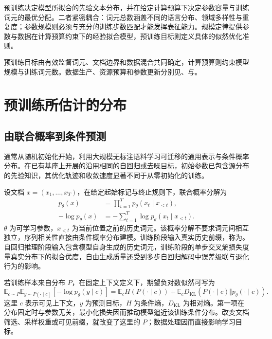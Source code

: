 \documentclass[../textbook.tex]{subfiles}
\begin{document}
\fi
{}

预训练决定模型所拟合的先验文本分布，并在给定计算预算下决定参数容量与训练词元的最优分配。二者紧密耦合：词元总数涵盖不同的语言分布、领域多样性与重复度；参数规模则必须与充分的训练步数匹配才能发挥表征能力。规模定律提供参数与数据在计算预算约束下的经验拟合模型，预训练目标则定义具体的似然优化准则。

预训练目标由有效监督词元、文档边界和数据混合共同确定，计算预算则约束模型规模与训练词元数。数据生产、资源预算和参数更新分别见、与。

\section{预训练所估计的分布}

\subsection{由联合概率到条件预测}
通常从随机初始化开始，利用大规模无标注语料学习可迁移的通用表示与条件概率分布。在已有基座上开展的沿用相同的自回归或去噪目标，初始参数已包含源分布的先验知识，其优化轨迹和收敛速度显著不同于从零初始化的训练。

设文档 $x=(x_1,\dots,x_T)$，在给定起始标记与终止规则下，联合概率分解为
\begin{equation}\label{eq:pt-chain}
\begin{aligned}
 p_\theta(x) &= \prod_{t=1}^{T}p_\theta(x_t\mid x_{<t}), \\
 -\log p_\theta(x) &= -\sum_{t=1}^{T}\log p_\theta(x_t\mid x_{<t}).
\end{aligned}
\end{equation}
$\theta$ 为可学习参数，$x_{<t}$ 为当前位置之前的历史词元。该概率分解不要求词元间相互独立，序列相关性直接由条件概率分布建模。训练阶段输入真实历史前缀，称为。自回归推理阶段输入包含模型自身生成的历史词元，训练阶段的单步交叉熵损失度量真实分布下的拟合优度，自由生成质量还受到多步自回归解码中误差级联与退化行为的影响。

若训练样本来自分布 $P$，在固定上下文定义下，期望负对数似然可写为
\begin{equation}
 \mathbb E_{c\sim P}\mathbb E_{y\sim P(\cdot\mid c)}[-\log p_\theta(y\mid c)]
 =\mathbb E_c H(P(\cdot\mid c))+
 \mathbb E_c D_{\mathrm{KL}}(P(\cdot\mid c)\Vert p_\theta(\cdot\mid c)).
 \label{eq:pt-risk}
\end{equation}
这里 $c$ 表示可见上下文，$y$ 为预测目标，$H$ 为条件熵，$D_{\mathrm{KL}}$ 为相对熵。第一项在分布固定时与参数无关，最小化损失因而推动模型逼近该训练条件分布。改变文档筛选、采样权重或可见前缀，就改变了这里的 $P$；数据处理因而直接影响学习目标。
\end{document}
